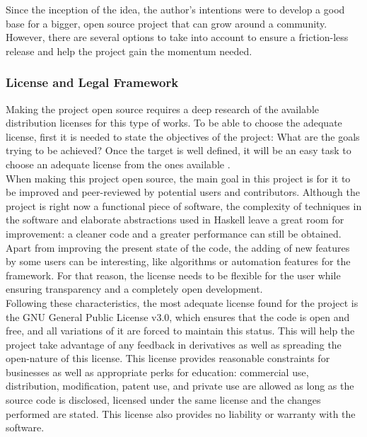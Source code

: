 Since the inception of the idea, the author's intentions were to develop a good
base for a bigger, open source project that can grow around a community.
However, there are several options to take into account to ensure a
friction-less release and help the project gain the momentum needed.

\subsubsection{License and Legal Framework}

Making the project open source requires a deep research of the available
distribution licenses for this type of works. To be able to choose the adequate
license, first it is needed to state the objectives of the project: What are the
goals trying to be achieved? Once the target is well defined, it will be an
easy task to choose an adequate license from the ones available
\cite{morin-2012-license}.\\

When making this project open source, the main goal in this project is
for it to be improved and peer-reviewed by potential users and contributors.
Although the project is right now a functional piece of software, the
complexity of techniques in the software and elaborate abstractions used in
Haskell leave a great room for improvement: a cleaner code and a greater
performance can still be obtained. Apart from improving the present state of
the code, the adding of new features by some users can be interesting, like
algorithms or automation features for the framework. For that reason, the
license needs to be flexible for the user while ensuring transparency and a
completely open development.\\

Following these characteristics, the most adequate license found for the
project is the GNU General Public License v3.0, which ensures that the code is
open and free, and all variations of it are forced to maintain this status.
This will help the project take advantage of any feedback in derivatives as
well as spreading the open-nature of this license. This license provides
reasonable constraints for businesses as well as appropriate perks for
education: commercial use, distribution, modification, patent use, and private
use are allowed as long as the source code is disclosed, licensed under the
same license and the changes performed are stated. This license also provides
no liability or warranty with the software.\\

